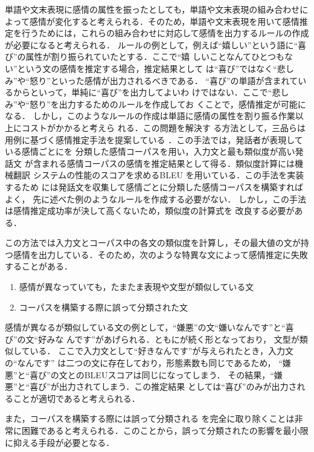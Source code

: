 \documentclass[japanese]{jnlp_1.4}
\def\resp#1{}
\def\respeqn#1{}
\begin{document}
単語や文末表現に感情の属性を振ったとしても，単語や文末表現の組み合わせに
よって感情が変化すると考えられる．そのため，単語や文末表現を用いて感情推
定を行うためには，これらの組み合わせに対応して感情を出力するルールの作成
が必要になると考えられる．
ルールの例として，例えば``嬉しい''という語に``喜び''の属性が割り振られていたとする．ここで``嬉
しいことなんてひとつもない''という文の感情を推定する場合，推定結果として
は``喜び''ではなく``悲しみ''や``怒り''といった感情が出力されるべきである．
``喜び''の単語が含まれているからといって，単純に``喜び''を出力してよいわ
けではない．ここで``悲しみ''や``怒り''を出力するためのルールを作成してお
くことで，感情推定が可能になる．
しかし，このようなルールの作成は単語に感情の属性を割り振る作業以上にコストがかかると考えら
れる．この問題を解決す
る方法として，三品らは用例に基づく感情推定手法を提案している
\cite{aiac}．この手法では，発話者が表現している感情ごとに\respeqn{発話文}を
分類した感情コーパスを用い，入力文と最も類似度が高い発話文
が含まれる感情コーパスの感情を推定結果として得る．類似度計算には機械翻訳
システムの性能のスコアを求めるBLEU \cite{bleu}を用いている．この手法を実装するため
には発話文を収集して感情ごとに分類した感情コーパスを構築すればよく，
先に述べた例のようなルールを作成する必要がない．
しかし，この手法は感情推定成功率が決して高くないため，類似度の計算式を
改良する必要がある．

この方法では入力文とコーパス中の各文の類似度を計算し，その最大値の文が持
つ感情を出力している．そのため，次のような特異な文によって感情推定に失敗
することがある．
\begin{enumerate}
 \item 感情が異なっていても，たまたま表現や文型が類似している文\label{enum:prob1}
 \item コーパスを構築する際に誤って分類された文\label{enum:prob2}
\end{enumerate}
感情が異なるが類似している文の例として，``嫌悪''の文``嫌いなんです''と``喜び''の文``好みな
んです''があげられる．ともに\resp{名詞の後に``なんです''}が続く形となっており，
文型が類似している．
ここで入力文として``好きなんです''が与えられたとき，入力文の``なんです''
は二つの文に存在しており，形態素数も同じであるため，
``嫌悪''と``喜び''の文とのBLEUスコアは同じになってしまう．
その結果，``嫌悪''と``喜び''が出力されてしまう．この推定結果
としては``喜び''のみが出力されることが適切であると考えられる．

また，コーパスを構築する際には誤って分類される\respeqn{発話文}
を完全に取り除くことは非常に困難であると考えられる．このことから，誤って分類された\respeqn{発話
文}の影響を最小限に抑える手段が必要となる．
\end{document}

